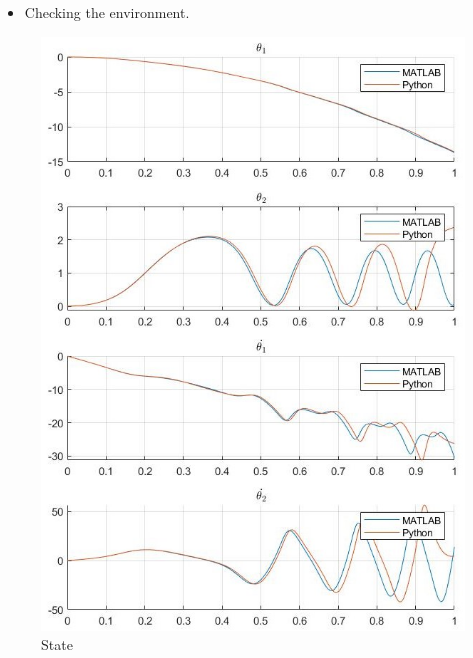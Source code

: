 \documentclass{beamer}
\begin{document}
    \begin{frame}
        \frametitle{\secname}

        \begin{itemize}
            \item Checking the environment.
        \end{itemize}
        \begin{figure}
            \begin{multicols*}{2}
                \centering
                \includegraphics[scale=.25]{./Figs/state.jpg}
                \caption{State}


\end{multicols*}
\end{figure}
\end{frame}
\end{document}
